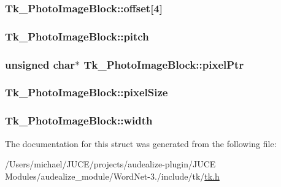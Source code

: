 \subsubsection[{\texorpdfstring{offset}{offset}}]{ Tk\+\_\+\+Photo\+Image\+Block\+::offset\mbox{[}4\mbox{]}}\hypertarget{struct_tk___photo_image_block_a41761f33de576b138426aba79525f107}{}\label{struct_tk___photo_image_block_a41761f33de576b138426aba79525f107}
\subsubsection[{\texorpdfstring{pitch}{pitch}}]{ Tk\+\_\+\+Photo\+Image\+Block\+::pitch}\hypertarget{struct_tk___photo_image_block_a7eb396ad73318a19e4c3ac0b12bc37e5}{}\label{struct_tk___photo_image_block_a7eb396ad73318a19e4c3ac0b12bc37e5}
\subsubsection[{\texorpdfstring{pixel\+Ptr}{pixelPtr}}]{\setlength{\rightskip}{0pt plus 5cm}unsigned char$\ast$ Tk\+\_\+\+Photo\+Image\+Block\+::pixel\+Ptr}\hypertarget{struct_tk___photo_image_block_a64241caa85c0dea5bef3ab2e7f603549}{}\label{struct_tk___photo_image_block_a64241caa85c0dea5bef3ab2e7f603549}
\subsubsection[{\texorpdfstring{pixel\+Size}{pixelSize}}]{ Tk\+\_\+\+Photo\+Image\+Block\+::pixel\+Size}\hypertarget{struct_tk___photo_image_block_a5f220a949e02d5b64dafda4f49d57d9b}{}\label{struct_tk___photo_image_block_a5f220a949e02d5b64dafda4f49d57d9b}
\subsubsection[{\texorpdfstring{width}{width}}]{ Tk\+\_\+\+Photo\+Image\+Block\+::width}\hypertarget{struct_tk___photo_image_block_a3f607860560e4fc21497c49545531ac9}{}\label{struct_tk___photo_image_block_a3f607860560e4fc21497c49545531ac9}


The documentation for this struct was generated from the following file\+:\begin{DoxyCompactItemize}
\item 
/\+Users/michael/\+J\+U\+C\+E/projects/audealize-\/plugin/\+J\+U\+C\+E Modules/audealize\+\_\+module/\+Word\+Net-\/3./include/tk/\hyperlink{tk_8h}{tk.\+h}\end{DoxyCompactItemize}
